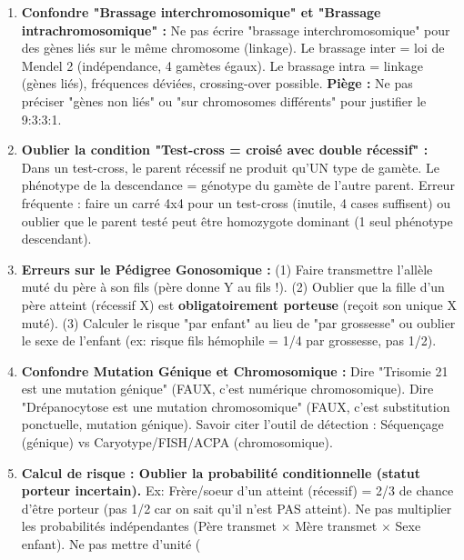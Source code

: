 \documentclass[11pt]{article}
\begin{document}
\begin{attention}
    \begin{enumerate}
        \item \textbf{Confondre "Brassage interchromosomique" et "Brassage intrachromosomique" :} Ne pas écrire "brassage interchromosomique" pour des gènes liés sur le même chromosome (linkage). Le brassage inter = loi de Mendel 2 (indépendance, 4 gamètes égaux). Le brassage intra = linkage (gènes liés), fréquences déviées, crossing-over possible. \textbf{Piège :} Ne pas préciser "gènes non liés" ou "sur chromosomes différents" pour justifier le 9:3:3:1.
        \item \textbf{Oublier la condition "Test-cross = croisé avec double récessif" :} Dans un test-cross, le parent récessif ne produit qu'UN type de gamète. Le phénotype de la descendance = génotype du gamète de l'autre parent. Erreur fréquente : faire un carré 4x4 pour un test-cross (inutile, 4 cases suffisent) ou oublier que le parent testé peut être homozygote dominant (1 seul phénotype descendant).
        \item \textbf{Erreurs sur le Pédigree Gonosomique :} (1) Faire transmettre l'allèle muté du père à son fils (père donne Y au fils !). (2) Oublier que la fille d'un père atteint (récessif X) est \textbf{obligatoirement porteuse} (reçoit son unique X muté). (3) Calculer le risque "par enfant" au lieu de "par grossesse" ou oublier le sexe de l'enfant (ex: risque fils hémophile = 1/4 par grossesse, pas 1/2).
        \item \textbf{Confondre Mutation Génique et Chromosomique :} Dire "Trisomie 21 est une mutation génique" (FAUX, c'est numérique chromosomique). Dire "Drépanocytose est une mutation chromosomique" (FAUX, c'est substitution ponctuelle, mutation génique). Savoir citer l'outil de détection : Séquençage (génique) vs Caryotype/FISH/ACPA (chromosomique).
        \item \textbf{Calcul de risque : Oublier la probabilité conditionnelle (statut porteur incertain).} Ex: Frère/soeur d'un atteint (récessif) = 2/3 de chance d'être porteur (pas 1/2 car on sait qu'il n'est PAS atteint). Ne pas multiplier les probabilités indépendantes (Père transmet $\times$ Mère transmet $\times$ Sexe enfant). Ne pas mettre d'unité (%
    \end{enumerate}
\end{attention}

\newpage
\end{document}
